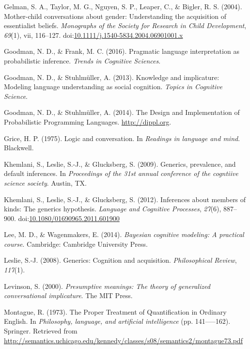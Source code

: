 \documentclass[floatsintext,doc]{apa6}
\begin{document}
\leavevmode\hypertarget{ref-GelmanEtAl2004}{}%
Gelman, S. A., Taylor, M. G., Nguyen, S. P., Leaper, C., \& Bigler, R. S. (2004). Mother-child conversations about gender: Understanding the acquisition of essentialist beliefs. \emph{Monographs of the Society for Research in Child Development}, \emph{69}(1), vii, 116--127. doi:\href{https://doi.org/10.1111/j.1540-5834.2004.06901001.x}{10.1111/j.1540-5834.2004.06901001.x}

\leavevmode\hypertarget{ref-Goodman2016}{}%
Goodman, N. D., \& Frank, M. C. (2016). Pragmatic language interpretation as probabilistic inference. \emph{Trends in Cognitive Sciences}.

\leavevmode\hypertarget{ref-Goodman2013}{}%
Goodman, N. D., \& Stuhlmüller, A. (2013). Knowledge and implicature: Modeling language understanding as social cognition. \emph{Topics in Cognitive Science}.

\leavevmode\hypertarget{ref-dippl}{}%
Goodman, N. D., \& Stuhlmüller, A. (2014). The Design and Implementation of Probabilistic Programming Languages. \url{http://dippl.org}.

\leavevmode\hypertarget{ref-Grice1975}{}%
Grice, H. P. (1975). Logic and conversation. In \emph{Readings in language and mind}. Blackwell.

\leavevmode\hypertarget{ref-Khemlani2009}{}%
Khemlani, S., Leslie, S.-J., \& Glucksberg, S. (2009). Generics, prevalence, and default inferences. In \emph{Proceedings of the 31st annual conference of the cogntiive science society}. Austin, TX.

\leavevmode\hypertarget{ref-Khemlani2012}{}%
Khemlani, S., Leslie, S.-J., \& Glucksberg, S. (2012). Inferences about members of kinds: The generics hypothesis. \emph{Language and Cognitive Processes}, \emph{27}(6), 887--900. doi:\href{https://doi.org/10.1080/01690965.2011.601900}{10.1080/01690965.2011.601900}

\leavevmode\hypertarget{ref-LeeWagenmakers2014}{}%
Lee, M. D., \& Wagenmakers, E. (2014). \emph{Bayesian cognitive modeling: A practical course}. Cambridge: Cambridge University Press.

\leavevmode\hypertarget{ref-Leslie2008}{}%
Leslie, S.-J. (2008). Generics: Cognition and acquisition. \emph{Philosophical Review}, \emph{117}(1).

\leavevmode\hypertarget{ref-Levinson2000}{}%
Levinson, S. (2000). \emph{Presumptive meanings: The theory of generalized conversational implicature}. The MIT Press.

\leavevmode\hypertarget{ref-Montague1973}{}%
Montague, R. (1973). The Proper Treatment of Quantification in Ordinary English. In \emph{Philosophy, language, and artificial intelligence} (pp. 141-----162). Springer. Retrieved from \url{http://semantics.uchicago.edu/kennedy/classes/s08/semantics2/montague73.pdf}
\end{document}
